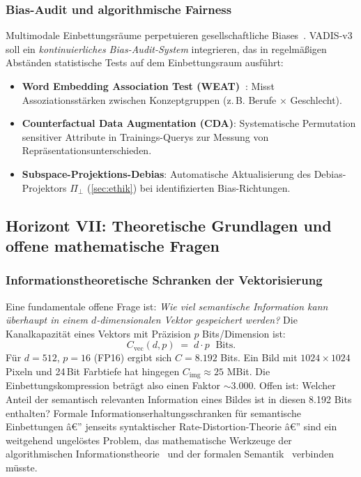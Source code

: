 ﻿\documentclass[12pt,a4paper]{article}
\begin{document}
\subsubsection{Bias-Audit und algorithmische Fairness}

Multimodale Einbettungsräume perpetuieren gesellschaftliche
Biases~\cite{bender2021stochastic}. VADIS-v3 soll ein
\emph{kontinuierliches Bias-Audit-System} integrieren,
das in regelmäßigen Abständen statistische Tests auf
dem Einbettungsraum ausführt:

\begin{itemize}[leftmargin=1.2em, itemsep=2pt]
  \item \textbf{Word Embedding Association Test (WEAT)~\cite{caliskan2017semantics}}:
        Misst Assoziationsstärken zwischen Konzeptgruppen
        (z.\,B. Berufe $\times$ Geschlecht).
  \item \textbf{Counterfactual Data Augmentation (CDA)}:
        Systematische Permutation sensitiver Attribute
        in Trainings-Querys zur Messung von
        Reprä\-sentationsunterschieden.
  \item \textbf{Subspace-Projektions-Debias}: Automatische
        Aktualisierung des Debias-Projektors $\Pi_\perp$
        (\cref{sec:ethik}) bei identifizierten Bias-Richtungen.
\end{itemize}

\subsection{Horizont VII: Theoretische Grundlagen und
            offene mathematische Fragen}
\label{sub:horizont7}

\subsubsection{Informationstheoretische Schranken der
              Vektorisierung}

Eine fundamentale offene Frage ist: \emph{Wie viel semantische
Information kann überhaupt in einem $d$-dimensionalen Vektor
gespeichert werden?} Die Kanalkapazität eines
Vektors mit Präzision $p$ Bits/Dimension ist:
\begin{equation}
  C_{\text{vec}}(d, p) \;=\; d \cdot p \;\text{ Bits}.
\end{equation}
Für $d = 512$, $p = 16$ (FP16) ergibt sich $C = 8.192$ Bits.
Ein Bild mit $1024 \times 1024$ Pixeln und 24\,Bit Farbtiefe
hat hingegen $C_{\text{img}} \approx 25$ MBit. Die
Einbettungskompression beträgt also einen Faktor $\sim 3.000$.
Offen ist: Welcher Anteil der semantisch relevanten Information
eines Bildes ist in diesen 8.192 Bits enthalten?
Formale Informationserhaltungsschranken für semantische
Einbettungen â€” jenseits syntaktischer Rate-Distortion-Theorie â€”
sind ein weitgehend ungelöstes Problem, das
mathematische Werkzeuge der algorithmischen
Informationstheorie~\cite{kolmogorov1965threapproaches}
und der formalen Semantik~\cite{montague1973formal} verbinden müsste.
\end{document}
